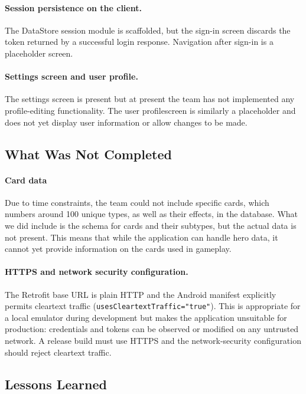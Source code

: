 \paragraph{Session persistence on the client.}
The DataStore session module is scaffolded, but the sign-in screen discards the token returned by a successful login response. Navigation after sign-in is a placeholder screen.

\paragraph{Settings screen and user profile.}
The settings screen is present but at present the team has not implemented any profile-editing functionality. The user profilescreen is similarly a placeholder and does not yet display user information or allow changes to be made.

\subsection{What Was Not Completed}

\paragraph{Card data}
Due to time constraints, the team could not include specific cards, which numbers around 100 unique types, as well as their effects, in the database. What we did include is the schema for cards and their subtypes, but the actual data is not present. This means that while the application can handle hero data, it cannot yet provide information on the cards used in gameplay.

\paragraph{HTTPS and network security configuration.}
The Retrofit base URL is plain HTTP and the Android manifest explicitly permits cleartext traffic (\texttt{usesCleartextTraffic="true"}). This is appropriate for a local emulator during development but makes the application unsuitable for production: credentials and tokens can be observed or modified on any untrusted network. A release build must use HTTPS and the network-security configuration should reject cleartext traffic.

\subsection{Lessons Learned}

